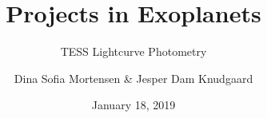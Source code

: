 \documentclass{beamer}
\title{Projects in Exoplanets}
\subtitle{TESS Lightcurve Photometry}
\author{Dina Sofia Mortensen \& Jesper Dam Knudgaard}
\institute{Stellar Astrophysics Centre, Aarhus University}
\date{January 18, 2019}
\begin{document}
\begin{frame}
\titlepage
\end{frame}

\begin{frame}

\end{frame}
\end{document}
